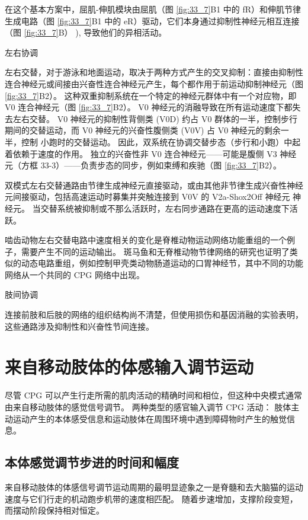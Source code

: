 在这个基本方案中，屈肌-伸肌模块由屈肌（图 \ref{fig:33_7}B1 中的 fR）和伸肌节律生成电路（图 \ref{fig:33_7}B1 中的 eR）驱动，它们本身通过抑制性神经元相互连接（图 \ref{fig:33_7}B） ), 导致他们的异相活动。


左右协调

左右交替，对于游泳和地面运动，取决于两种方式产生的交叉抑制：直接由抑制性连合神经元或间接由兴奋性连合神经元产生，每个都作用于前运动抑制神经元（图 \ref{fig:33_7}B2）。
这种双重抑制系统在一个特定的神经元群体中有一个对应物，即 V0 连合神经元（图 \ref{fig:33_7}B2）。
V0 神经元的消融导致在所有运动速度下都失去左右交替。
V0 神经元的抑制性背侧类 (V0D) 约占 V0 群体的一半，控制步行期间的交替运动，而 V0 神经元的兴奋性腹侧类 (V0V) 占 V0 神经元的剩余一半，控制 小跑时的交替运动。 因此，双系统在协调交替步态（步行和小跑）中起着依赖于速度的作用。
独立的兴奋性非 V0 连合神经元——可能是腹侧 V3 神经元（方框 33-3）——负责步态的同步，例如束缚和疾驰（图 \ref{fig:33_7}B2）。


双模式左右交替通路由节律生成神经元直接驱动，或由其他非节律生成兴奋性神经元间接驱动，包括高速运动时募集并突触连接到 V0V 的 V2a-Shox2Off 神经元 神经元。
当交替系统被抑制或不那么活跃时，左右同步通路在更高的运动速度下活跃。


啮齿动物左右交替电路中速度相关的变化是脊椎动物运动网络功能重组的一个例子，需要产生不同的运动输出。
斑马鱼和无脊椎动物节律网络的研究也证明了类似的动态电路重组，例如控制甲壳类动物肠道运动的口胃神经节，其中不同的功能网络从一个共同的 CPG 网络中出现。


肢间协调

连接前肢和后肢的网络的组织结构尚不清楚，但使用损伤和基因消融的实验表明，这些通路涉及抑制性和兴奋性节间连接。



\section{来自移动肢体的体感输入调节运动}

尽管 CPG 可以产生行走所需的肌肉活动的精确时间和相位，但这种中央模式通常由来自移动肢体的感觉信号调节。
两种类型的感官输入调节 CPG 活动：
肢体主动运动产生的本体感受信息和运动肢体在周围环境中遇到障碍物时产生的触觉信息。


\subsection{本体感觉调节步进的时间和幅度}

来自移动肢体的体感信号调节运动周期的最明显迹象之一是脊髓和去大脑猫的运动速度与它们行走的机动跑步机带的速度相匹配。
随着步速增加，支撑阶段变短，而摆动阶段保持相对恒定。


